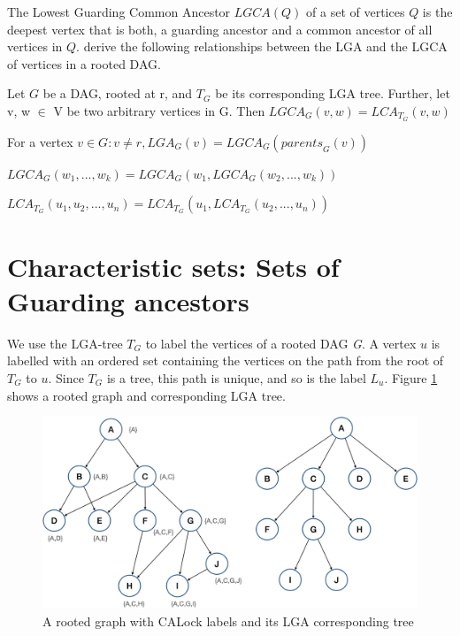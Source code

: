 The Lowest Guarding Common Ancestor $LGCA(Q)$ of a set of vertices $Q$ is the deepest vertex that is both, a guarding ancestor and a common ancestor of all vertices in $Q$. \citet{fischer2010new} derive the following relationships between the LGA and the LGCA of vertices in a rooted DAG.


\begin{lemma}\label{lscaislca}
	Let $G$ be a DAG, rooted at r, and $T_G$ be its corresponding LGA tree. Further, let v, w $\in$ V be two arbitrary vertices in G. Then $LGCA_G(v,w) = LCA_{T_G}(v,w)$
\end{lemma}



\begin{lemma}\label{lgaislgcaofparents}
		For a vertex $v \in G: v \neq r , LGA_G(v) = LGCA_G(\mathit{parents}_G(v))$
\end{lemma}


\begin{definition}\label{associativelgca}
		$LGCA_G (w_1, ... ,w_k) = LGCA_G (w_1, LGCA_G (w_2, ... ,w_k))$
\end{definition}

\begin{definition}\label{associativelca}
	$LCA_{T_G} (u_1, u_2,..., u_n) = LCA_{T_G} (u_1, LCA_{T_G} (u_2,...,u_n))$
\end{definition}

\section{Characteristic sets: Sets of Guarding ancestors}

We use the LGA-tree $T_G$ to label the vertices of a rooted DAG \emph{G}.
A vertex $u$ is labelled with an ordered set containing the vertices on the path from the root of $T_G$ to $u$. Since $T_G$ is a tree, this path is unique, and so is the label $L_u$. Figure \ref{fig:LGATree} shows a rooted graph and corresponding LGA tree.

\begin{figure}
	\centering
	\captionsetup{justification=centering}
	\includegraphics[width=\textwidth]{figures/LGATree.png}
	\caption{A rooted graph with CALock labels and its LGA corresponding tree} \label{fig:LGATree}
\end{figure}

